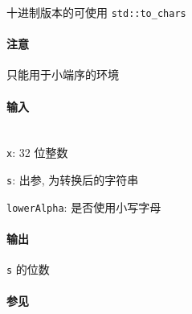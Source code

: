 十进制版本的可使用 \verb|std::to_chars|

\paragraph{注意}

只能用于小端序的环境

\paragraph{输入}~\\

\verb|x|: 32 位整数

\verb|s|: 出参, 为转换后的字符串

\verb|lowerAlpha|: 是否使用小写字母

\paragraph{输出}

\verb|s| 的位数

\paragraph{参见}

